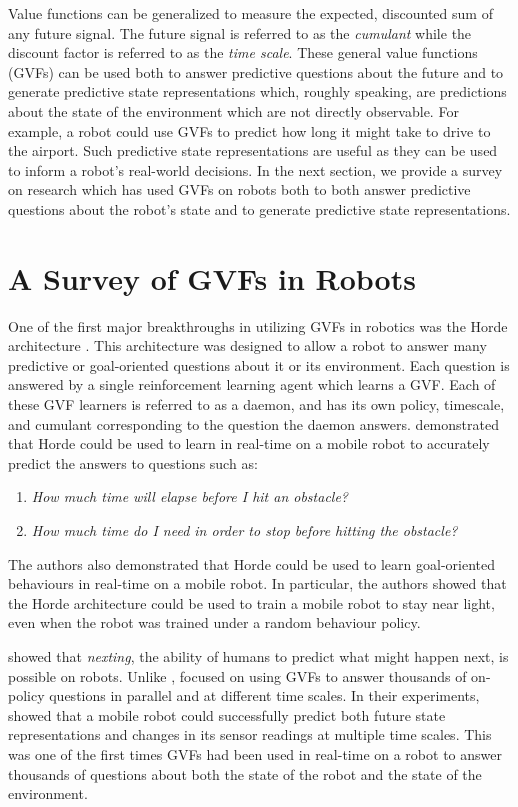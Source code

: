 \documentclass{article} %
\theoremstyle{plain}
\theoremstyle{definition}
\theoremstyle{remark}
\begin{document}
Value functions can be generalized to measure the expected, discounted sum of any future signal. The future signal is
referred to as the \textit{cumulant} while the discount factor is referred to as the \textit{time scale}. These general
value functions (GVFs) can be used both to answer predictive questions about the future and to generate
predictive state representations which, roughly speaking, are predictions about the state of the environment
which are not directly observable. For example, a robot could use GVFs to predict how long it might take to drive to the
airport. Such predictive state representations are useful as they can be used to inform a robot's real-world decisions.
In the next section, we provide a survey on research which has used GVFs on robots both to both answer predictive
questions about the robot's state and to generate predictive state representations.

\section{A Survey of GVFs in Robots}%

One of the first major breakthroughs in utilizing GVFs in robotics was the Horde architecture \citep{sutton2011horde}.
This architecture was designed to allow a robot to answer many predictive or goal-oriented questions about it or its
environment. Each question is answered by a single reinforcement learning agent which learns a GVF. Each of these GVF
learners is referred to as a daemon, and has its own policy, timescale, and cumulant corresponding to the question the
daemon answers. \cite{sutton2011horde} demonstrated that Horde could be used to learn in real-time on a mobile robot
to accurately predict the answers to questions such as:
\begin{enumerate}
	\item \textit{How much time will elapse before I hit an obstacle?}
	\item \textit{How much time do I need in order to stop before hitting the obstacle?}
\end{enumerate}
The authors also demonstrated that Horde could be used to learn goal-oriented behaviours in real-time on a mobile robot.
In particular, the authors showed that the Horde architecture could be used to train a mobile robot to stay near light,
even when the robot was trained under a random behaviour policy.

\cite{modayil2012nexting} showed that \textit{nexting}, the ability of humans to predict what might happen next,
is possible on robots. Unlike \cite{sutton2011horde}, \cite{modayil2012nexting} focused on using GVFs to answer
thousands of on-policy questions in parallel and at different time scales. In their experiments,
\cite{modayil2012nexting} showed that a mobile robot could successfully predict both future state representations and
changes in its sensor readings at multiple time scales. This was one of the first times GVFs had been used in real-time on a robot
to answer thousands of questions about both the state of the robot and the state of the environment.
\end{document}
